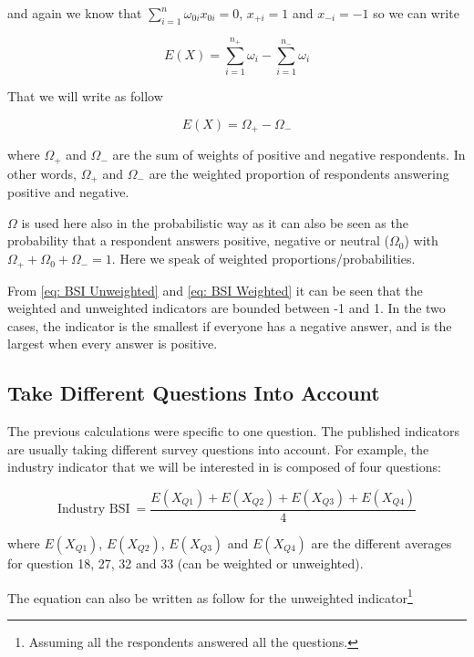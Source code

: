 \documentclass[12pt,a4paper,oneside]{book}
\begin{document}
and again we know that $\sum_{i=1}^n \omega_{0i} x_{0i} = 0$, $x_{+i} = 1$ and $x_{-i}=-1$ so we can write

\begin{equation}
    E(X) = \sum_{i=1}^{n_+} \omega_{i}  - \sum_{i=1}^{n_-} \omega_{i}
\end{equation}

That we will write as follow

\begin{equation}
    E(X) = \Omega_+ - \Omega_- \label{eq: BSI Weighted}
\end{equation}

where $\Omega_+$ and $\Omega_-$ are the sum of weights of positive and negative respondents. 
In other words, $\Omega_+$ and $\Omega_-$ are the weighted proportion of respondents answering positive and negative. 

$\Omega$ is used here also in the probabilistic way as it can also be seen as the probability that a respondent answers positive, negative or neutral ($\Omega_0$) with $\Omega_+ + \Omega_0 + \Omega_- =1$. Here we speak of weighted proportions/probabilities.

From \autoref{eq: BSI Unweighted} and \autoref{eq: BSI Weighted} it can be seen that the weighted and unweighted indicators are bounded between -1 and 1. In the two cases, the indicator is the smallest if everyone has a negative answer, and is the largest when every answer is positive.

\subsection{Take Different Questions Into Account}

The previous calculations were specific to one question. The published indicators are usually taking different survey questions into account. For example, the industry indicator that we will be interested in is composed of four questions:

\begin{equation}
    \mbox{Industry BSI}\ = \frac{E(X_{Q1}) + E(X_{Q2}) + E(X_{Q3}) + E(X_{Q4})}{4}
\end{equation}

where 
$E(X_{Q1})$, $E(X_{Q2})$, $E(X_{Q3})$ and $E(X_{Q4})$ are the different averages for question 18, 27, 32 and 33 (can be weighted or unweighted).

The equation can also be written as follow for the unweighted indicator\footnote{Assuming all the respondents answered all the questions.}
\end{document}
